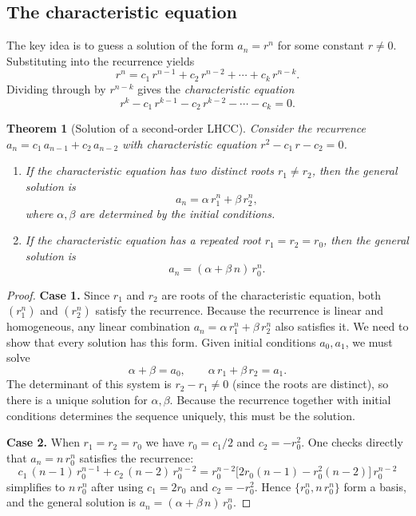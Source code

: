 \documentclass[12pt,a4paper,openany]{book}
\theoremstyle{definition}
\theoremstyle{plain}
\newtheorem{theorem}[definition]{Theorem}
\theoremstyle{remark}
\begin{document}
\subsection{The characteristic equation}\label{ssec:char-eq}

The key idea is to guess a solution of the form $a_n = r^n$ for some
constant $r \neq 0$.  Substituting into the recurrence yields
\[
   r^n = c_1\, r^{n-1} + c_2\, r^{n-2} + \cdots + c_k\, r^{n-k}.
\]
Dividing through by $r^{n-k}$ gives the \emph{characteristic equation}
\begin{equation}\label{eq:char-eq}
   r^k - c_1\, r^{k-1} - c_2\, r^{k-2} - \cdots - c_k = 0.
\end{equation}

\begin{theorem}[Solution of a second-order LHCC]\label{thm:LHCC-order2}
Consider the recurrence $a_n = c_1\, a_{n-1} + c_2\, a_{n-2}$ with
characteristic equation $r^2 - c_1\, r - c_2 = 0$.
\begin{enumerate}
\item If the characteristic equation has two distinct roots $r_1 \neq r_2$,
      then the general solution is
      \[
         a_n = \alpha\, r_1^n + \beta\, r_2^n,
      \]
      where $\alpha, \beta$ are determined by the initial conditions.
\item If the characteristic equation has a repeated root $r_1 = r_2 = r_0$,
      then the general solution is
      \[
         a_n = (\alpha + \beta\, n)\, r_0^n.
      \]
\end{enumerate}
\end{theorem}

\begin{proof}
\textbf{Case 1.} Since $r_1$ and $r_2$ are roots of the characteristic
equation, both $(r_1^n)$ and $(r_2^n)$ satisfy the recurrence.  Because
the recurrence is linear and homogeneous, any linear combination
$a_n = \alpha\, r_1^n + \beta\, r_2^n$ also satisfies it.  We need to
show that every solution has this form.  Given initial conditions
$a_0, a_1$, we must solve
\[
   \alpha + \beta = a_0, \qquad
   \alpha\, r_1 + \beta\, r_2 = a_1.
\]
The determinant of this system is $r_2 - r_1 \neq 0$ (since the roots
are distinct), so there is a unique solution for $\alpha, \beta$.
Because the recurrence together with initial conditions determines the
sequence uniquely, this must be the solution.

\textbf{Case 2.} When $r_1 = r_2 = r_0$ we have
$r_0 = c_1/2$ and $c_2 = -r_0^2$.  One checks directly that
$a_n = n\, r_0^n$ satisfies the recurrence:
\[
   c_1\, (n-1)\, r_0^{n-1} + c_2\, (n-2)\, r_0^{n-2}
   = r_0^{n-2}\bigl[2r_0(n-1) - r_0^2(n-2)\bigr]\, r_0^{n-2}
\]
simplifies to $n\, r_0^n$ after using $c_1 = 2r_0$ and $c_2 = -r_0^2$.
Hence $\{r_0^n, n\, r_0^n\}$ form a basis, and the general solution is
$a_n = (\alpha + \beta\, n)\, r_0^n$.
\end{proof}
\end{document}
